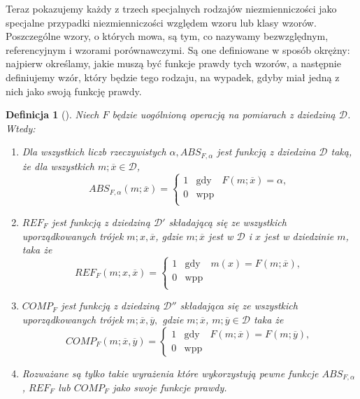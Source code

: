 \documentclass[12pt,a4paper]{report}
\newtheorem{definition}{Definicja}[chapter]
\begin{document}
Teraz pokazujemy każdy z trzech specjalnych rodzajów niezmienniczości jako specjalne przypadki niezmienniczości względem wzoru lub klasy wzorów. Poszczególne wzory, o których mowa, są tym, co nazywamy bezwzględnym, referencyjnym i wzorami porównawczymi. Są one definiowane w sposób okrężny: najpierw określamy, jakie muszą być funkcje prawdy tych wzorów, a następnie definiujemy wzór, który będzie tego rodzaju, na wypadek, gdyby miał jedną z nich jako swoją funkcję prawdy. 
\begin{definition}[{\citep[Def. 9]{adams1965theory}}]
Niech $F$ będzie uogólnioną operacją na pomiarach z dziedziną $\mathcal{D}$. Wtedy:
\begin{enumerate}
\item
Dla wszystkich liczb rzeczywistych $\alpha, ABS_{F,\alpha}$ jest funkcją z dziedzina $\mathcal{D}$ taką, że dla wszystkich $m;\overline{x} \in \mathcal{D}$,
\begin{equation*}
ABS_{F,\alpha}(m;\overline{x})= \left\{ \begin{array}{lcl}
1 & \textrm{gdy} & F(m;\overline{x})=\alpha,\\
0 & \textrm{wpp}\\
\end{array} \right.
\end{equation*}
\item
$REF_{F}$ jest funkcją z dziedziną $\mathcal{D'}$ składającą się ze wszystkich uporządkowanych trójek $m;x,\overline{x}$, gdzie $m;\overline{x}$ jest w $\mathcal{D}$ i $x$ jest w dziedzinie $m$, taka że
\begin{equation*}
REF_{F}(m;x,\overline{x})= \left\{ \begin{array}{lcl}
1 & \textrm{gdy} & m(x)=F(m;\overline{x}),\\
0 & \textrm{wpp}\\
\end{array} \right.
\end{equation*}
\item
$COMP_{F}$ jest funkcją z dziedziną $\mathcal{D''}$ składająca się ze wszystkich uporządkowanych trójek $m;\overline{x},\overline{y},$ gdzie $m;\overline{x}$, $m;\overline{y} \in \mathcal{D}$ taka że
\begin{equation*}
COMP_{F}(m;\overline{x},\overline{y})= \left\{ \begin{array}{lcl}
1 & \textrm{gdy} & F(m;\overline{x})=F(m;\overline{y}),\\
0 & \textrm{wpp}
\end{array} \right.
\end{equation*}
\item
Rozważane są tylko takie wyrażenia które wykorzystują pewne funkcje $ABS_{F,\alpha}$, $REF_{F}$ lub $COMP_{F}$ jako swoje funkcje prawdy.
\end{enumerate}
\end{definition}
\end{document}
